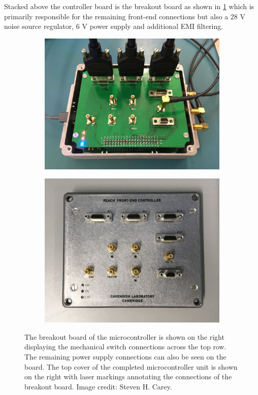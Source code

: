 Stacked above the controller board is the breakout board as shown in \cref{fig:break_board} which is primarily responsible for the remaining front-end connections but also a 28 V noise source regulator, 6 V power supply and additional EMI filtering.
\begin{figure}
\centering
    \centering
    \begin{subfigure}{.5\textwidth}
        \centering
        \includegraphics[width=\linewidth]{ucon}
    \end{subfigure}
    \hfill
    \begin{subfigure}{.45\textwidth}
    \centering
        \includegraphics[width=\linewidth]{ucon_cover}
    \end{subfigure}
    \caption{The breakout board of the microcontroller is shown on the right displaying the mechanical switch connections across the top row. The remaining power supply connections can also be seen on the board. The top cover of the completed microcontroller unit is shown on the right with laser markings annotating the connections of the breakout board. Image credit: Steven H. Carey.}
    \label{fig:break_board}
\end{figure}

